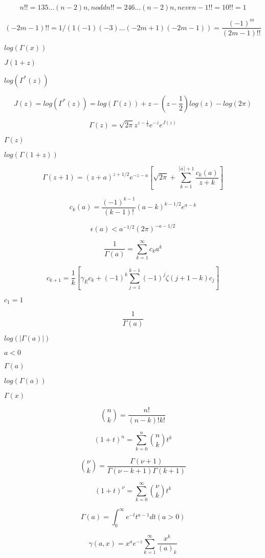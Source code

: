 \documentclass{article}
\begin{document}
\[ n!! = 1 3 5 ... (n-2) n, n odd n!! = 2 4 6 ... (n-2) n, n even -1!! = 1 0!! = 1 \]
\pagebreak

\[ (-2m - 1)!! = 1 / (1 (-1) (-3) ... (-2m + 1) (-2m - 1)) = \frac{(-1)^m}{(2m-1)!!} \]
\pagebreak

$log(\Gamma(x))$
\pagebreak

$ J(1+z) $
\pagebreak

$ log(\Gamma^*(z)) $
\pagebreak

\[ J(z) = log(\Gamma^*(z)) = log\left(\Gamma(z)\right) + z - \left(z-\frac{1}{2}\right) log(z) - log(2\pi) \]
\pagebreak

\[ \Gamma(z) = \sqrt{2\pi}z^{z-\frac{1}{2}}e^{-z}e^{J(z)} \]
\pagebreak

$ \Gamma(z) $
\pagebreak

$ log(\Gamma(1+z)) $
\pagebreak

\[ \Gamma(z+1) = (z+a)^{z+1/2}e^{-z-a}\left[ \sqrt{2\pi} + \sum_{k=1}^{\lceil a \rceil + 1}\frac{c_k(a)}{z+k}\right] \]
\pagebreak

\[ c_k(a) = \frac{(-1)^{k-1}}{(k-1)!}(a-k)^{k-1/2}e^{a-k} \]
\pagebreak

\[ \epsilon(a) < a^{-1/2}(2\pi)^{-a-1/2} \]
\pagebreak

\[ \frac{1}{\Gamma(a)} = \sum_{k=1}^{\infty} c_k a^k \]
\pagebreak

\[ c_{k+1} = \frac{1}{k}\left[\gamma_E c_k + (-1)^k\sum_{j=1}^{k-1}(-1)^j\zeta(j+1-k)c_j\right] \]
\pagebreak

$ c_1 = 1 $
\pagebreak

\[ \frac{1}{\Gamma(a)} \]
\pagebreak

$ log(|\Gamma(a)|) $
\pagebreak

$ a < 0 $
\pagebreak

$ \Gamma(a) $
\pagebreak

$ log(\Gamma(a)) $
\pagebreak

$ \Gamma(x) $
\pagebreak

\[ \binom{n}{k} = \frac{n!}{(n-k)! k!} \]
\pagebreak

\[ \left(1 + t\right)^n = \sum_{k=0}^n \binom{n}{k} t^k \]
\pagebreak

\[ \binom{\nu}{k} = \frac{\Gamma(\nu+1)}{\Gamma(\nu-k+1) \Gamma(k+1)} \]
\pagebreak

\[ \left(1 + t\right)^\nu = \sum_{k=0}^\infty \binom{\nu}{k} t^k \]
\pagebreak

\[ \Gamma(a) = \int_0^\infty e^{-t}t^{a-1}dt (a > 0) \]
\pagebreak

\[ \gamma(a,x) = x^a e^{-z}\sum_{k=1}^{\infty} \frac{x^k}{(a)_k} \]
\pagebreak
\end{document}
